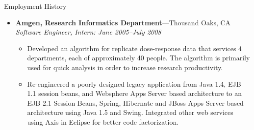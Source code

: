 \documentclass[11pt,oneside]{article}
\newenvironment{ressectionx}[1]{
	\vspace{4pt}
	{\fontfamily{phv}\selectfont\Large#1}
	\begin{itemize}[label={}]
	\vspace{3pt}
}{
	\end{itemize}
}
\newcommand{\ressubitem}[1]{
	\vspace{-1pt}
	\item \begin{flushleft} #1 \end{flushleft}
}
\newcommand{\resbigitem}[3]{
	\vspace{-5pt}
	\item
	\textbf{#1}---#2 \\
	\textit{#3}
}
\newenvironment{ressubsec}[3]{
	\resbigitem{#1}{#2}{#3}
	\vspace{-2pt}
	\begin{itemize}
}{
	\end{itemize}
}
\begin{document}
\begin{ressectionx}{Employment History}
	\begin{ressubsec}{Amgen, Research Informatics Department}{Thousand Oaks, CA}{Software Engineer, Intern: June 2005--July 2008}
		\ressubitem{Developed an algorithm for replicate dose-response data that services 4 departments, each of approximately 40 people. The algorithm is primarily used for quick analysis in order to increase research productivity.}
		\ressubitem{Re-engineered a poorly designed legacy application from Java 1.4, EJB 1.1 session beans, and Websphere Apps Server based architecture to an EJB 2.1 Session Beans, Spring, Hibernate and JBoss Apps Server based architecture using Java 1.5 and Swing. Integrated other web services using Axis in Eclipse for better code factorization.}
		
	\end{ressubsec}


\end{ressectionx}
\end{document}
